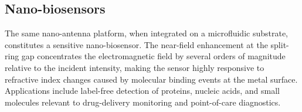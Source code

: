 \subsection{Nano-biosensors}

The same nano-antenna platform, when integrated on a microfluidic substrate, constitutes a sensitive nano-biosensor. The near-field enhancement at the split-ring gap concentrates the electromagnetic field by several orders of magnitude relative to the incident intensity, making the sensor highly responsive to refractive index changes caused by molecular binding events at the metal surface. Applications include label-free detection of proteins, nucleic acids, and small molecules relevant to drug-delivery monitoring and point-of-care diagnostics.
